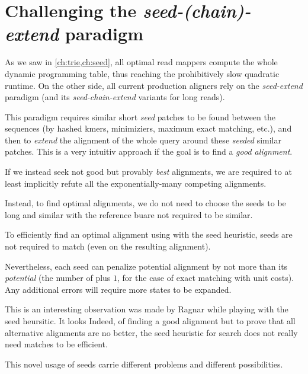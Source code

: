 \section{Challenging the \emph{seed-(chain)-extend} paradigm}

As we saw in \cref{ch:trie,ch:seed}, all optimal read mappers compute the whole
dynamic programming table, thus reaching the prohibitively slow quadratic
runtime. On the other side, all current production aligners rely on the
\emph{seed-extend} paradigm (and its \emph{seed-chain-extend} variants for long
reads).

This paradigm requires similar short \emph{seed} patches to be found
between the sequences (\eg by hashed kmers, minimiziers, maximum exact matching,
etc.), and then to \emph{extend} the alignment of the whole query around these
\emph{seeded} similar patches. This is a very intuitiv approach if the goal is
to find a \emph{good alignment}.

If we instead seek not good but provably \emph{best} alignments, we are required
to at least implicitly refute all the exponentially-many competing alignments.

Instead, to find optimal alignments, we do not need to choose the seeds to be
long and similar with the reference buare not required to be similar.

\begin{observation}
    To efficiently find an optimal alignment using \A with the seed heuristic,
    seeds are not required to match (even on the resulting alignment).
\end{observation}

Nevertheless, each seed can penalize potential alignment by not more than its
\emph{potential} (\ie the number of plus $1$, for the case of exact matching
with unit costs). Any additional errors will require more states to be expanded.

This is an interesting observation was made by Ragnar while playing with the
seed heursitic. It looks Indeed, of finding a good alignment but to prove that all
alternative alignments are no better, the seed heuristic for \A search does not
really need matches to be efficient.

This novel usage of seeds carrie different problems and different possibilities.